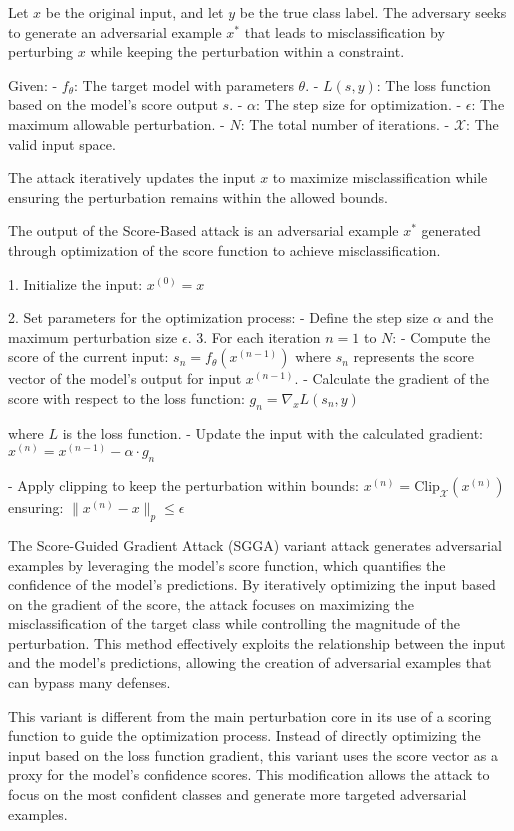 Let $x$ be the original input, and let $y$ be the true class label. The adversary seeks to generate an adversarial example $x^*$ that leads to misclassification by perturbing $x$ while keeping the perturbation within a constraint.

Given:
- $f_{\theta}$: The target model with parameters $\theta$.
- $L(s, y)$: The loss function based on the model’s score output $s$.
- $\alpha$: The step size for optimization.
- $\epsilon$: The maximum allowable perturbation.
- $N$: The total number of iterations.
- $\mathcal{X}$: The valid input space.

The attack iteratively updates the input $x$ to maximize misclassification while ensuring the perturbation remains within the allowed bounds.


The output of the Score-Based attack is an adversarial example $x^*$ generated through optimization of the score function to achieve misclassification.

1. Initialize the input:
   $x^{(0)} = x$
   
2. Set parameters for the optimization process:
   - Define the step size $\alpha$ and the maximum perturbation size $\epsilon$.
3. For each iteration $n = 1$ to $N$:
   - Compute the score of the current input:
   $s_n = f_{\theta}(x^{(n-1)})$
   where $s_n$ represents the score vector of the model's output for input $x^{(n-1)}$.
   - Calculate the gradient of the score with respect to the loss function:
   $g_n = \nabla_x L(s_n, y)$
   
   where $L$ is the loss function.
   - Update the input with the calculated gradient:
   $x^{(n)} = x^{(n-1)} - \alpha \cdot g_n$
   
   - Apply clipping to keep the perturbation within bounds:
   $x^{(n)} = \text{Clip}_{\mathcal{X}}(x^{(n)})$
   ensuring:
   $\|x^{(n)} - x\|_p \leq \epsilon$

The Score-Guided Gradient Attack (SGGA) variant attack generates adversarial examples by leveraging the model's score function, which quantifies the confidence of the model's predictions. By iteratively optimizing the input based on the gradient of the score, the attack focuses on maximizing the misclassification of the target class while controlling the magnitude of the perturbation. This method effectively exploits the relationship between the input and the model's predictions, allowing the creation of adversarial examples that can bypass many defenses.

This variant is different from the main perturbation core in its use of a scoring function to guide the optimization process. Instead of directly optimizing the input based on the loss function gradient, this variant uses the score vector as a proxy for the model's confidence scores. This modification allows the attack to focus on the most confident classes and generate more targeted adversarial examples.